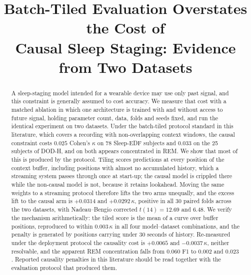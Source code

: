 \documentclass[conference]{IEEEtran}
\begin{document}
\title{Batch-Tiled Evaluation Overstates the Cost of\\Causal Sleep Staging: Evidence from Two Datasets}

\author{
}

\maketitle

\begin{abstract}
A sleep-staging model intended for a wearable device may use only past signal, and this
constraint is generally assumed to cost accuracy. We measure that cost with a matched ablation
in which one architecture is trained with and without access to future signal, holding
parameter count, data, folds and seeds fixed, and run the identical experiment on two datasets.
Under the batch-tiled protocol standard in this literature, which covers a recording with
non-overlapping context windows, the causal constraint costs $0.025$ Cohen's $\kappa$ on 78
Sleep-EDF subjects and $0.033$ on the 25 subjects of DOD-H, and on both appears concentrated in
REM. We show that most of this is produced by the protocol. Tiling scores predictions at every
position of the context buffer, including positions with almost no accumulated history, which a
streaming system passes through once at start-up; the causal model is crippled there while the
non-causal model is not, because it retains lookahead. Moving the same weights to a streaming
protocol therefore lifts the two arms unequally, and the excess lift to the causal arm is
$+0.0314$ and $+0.0292\,\kappa$, positive in all 30 paired folds across the two datasets, with
Nadeau--Bengio corrected $t(14) = 12.69$ and $6.48$. We verify the mechanism arithmetically: the
tiled score is the mean of a curve over buffer positions, reproduced to within $0.003\,\kappa$
in all four model--dataset combinations, and the penalty is generated by positions carrying
under 30 seconds of history. Re-measured under the deployment protocol the causality cost is
$+0.0065$ and $-0.0037\,\kappa$, neither resolvable, and the apparent REM concentration falls
from $0.060$ F1 to $0.002$ and $0.023$. Reported causality penalties in this literature should
be read together with the evaluation protocol that produced them.
\end{abstract}
\end{document}
